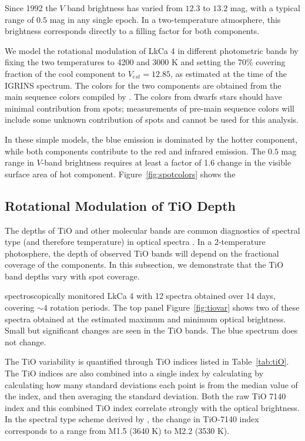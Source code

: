 \documentclass[twocolumn]{emulateapj}%
\begin{document}
Since 1992 the $V$ band brightness has varied from $12.3$ to $13.2$ mag, with a typical range of $0.5$ mag in any single epoch.  In a two-temperature atmosphere, this brightness corresponds directly to a filling factor for both components.  

We model the rotational modulation of LkCa 4 in different photometric bands by fixing the two temperatures to 4200 and 3000 K and setting the 70\% covering fraction of the cool component to $V_{est}=12.85$, as estimated at the time of the IGRINS spectrum.  The colors for the two components are obtained from the main sequence colors compiled by \citet{kenyon95}.  The colors from dwarfs stars should have minimal contribution from spots; measurements of pre-main sequence colors will include some unknown contribution of spots and cannot be used for this analysis.  

In these simple models, the blue emission is dominated by the hotter component, while both components contribute to the red and infrared emission.   
The $0.5$ mag range in $V$-band brightness requires at least a factor of 1.6 change in the visible surface area of hot component.  Figure~\ref{fig:spotcolors} shows the 



\subsection{Rotational Modulation of TiO Depth}

The depths of TiO and other molecular bands are common diagnostics of spectral type (and therefore temperature) in optical spectra \citep[e.g.][]{kirkpatrick91}.  In a 2-temperature photosphere, the depth of observed TiO bands will depend on the fractional coverage of the components.  In this subsection, we demonstrate that the TiO band depths vary with spot coverage.

\citet{donati14} spectroscopically monitored LkCa 4 with 12 spectra obtained over 14 days, covering $\sim 4$ rotation periods.  The top panel Figure~\ref{fig:tiovar} shows two of these spectra obtained at the estimated maximum and minimum optical brightness.  Small but significant changes are seen in the TiO bands.  The blue spectrum does not change.

The TiO variability is quantified through TiO indices listed in Table~\ref{tab:tiO}.  The TiO indices are also combined into a single index by calculating by 
calculating how many standard deviations each point is from the median value of the index, and then averaging the standard deviation.  Both the raw TiO 7140 index and this combined TiO index correlate strongly with the optical brightness.  In the spectral type scheme derived by \citet{herczeg14}, the change in TiO-7140 index corresponds to a range from M1.5 (3640 K) to M2.2 (3530 K).
\end{document}

